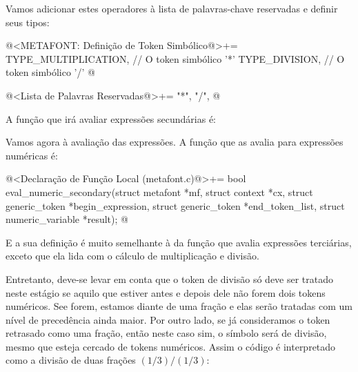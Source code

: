 Vamos adicionar estes operadores à lista de palavras-chave reservadas
e definir seus tipos:

\iniciocodigo
@<METAFONT: Definição de Token Simbólico@>+=
TYPE_MULTIPLICATION,        // O token simbólico '*'
TYPE_DIVISION,              // O token simbólico '/'
@
\fimcodigo

\iniciocodigo
@<Lista de Palavras Reservadas@>+=
"*", "/",
@
\fimcodigo

A função que irá avaliar expressões secundárias é:

Vamos agora à avaliação das expressões. A função que as avalia para
expressões numéricas é:

\iniciocodigo
@<Declaração de Função Local (metafont.c)@>+=
bool eval_numeric_secondary(struct metafont *mf, struct context *cx,
                            struct generic_token *begin_expression,
                            struct generic_token *end_token_list,
                            struct numeric_variable *result);
@
\fimcodigo

E a sua definição é muito semelhante à da função que avalia expressões
terciárias, exceto que ela lida com o cálculo de multiplicação e
divisão.

Entretanto, deve-se levar em conta que o token de divisão só deve ser
tratado neste estágio se aquilo que estiver antes e depois dele não
forem dois tokens numéricos. See forem, estamos diante de uma fração e
elas serão tratadas com um nível de precedência ainda maior. Por outro
lado, se já consideramos o token retrasado como uma fração, então
neste caso sim, o símbolo será de divisão, mesmo que esteja cercado de
tokens numéricos. Assim o código  é interpretado
como a divisão de duas frações $(1/3)/(1/3)$:


